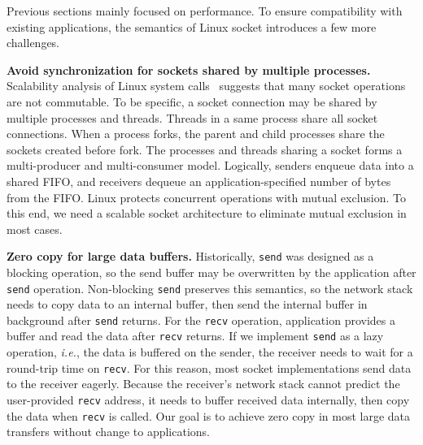 Previous sections mainly focused on performance. To ensure compatibility with existing applications, the semantics of Linux socket introduces a few more challenges.


\textbf{Avoid synchronization for sockets shared by multiple processes.}
Scalability analysis of Linux system calls~\cite{boyd2010analysis} suggests that many socket operations are not commutable. To be specific, a socket connection may be shared by multiple processes and threads. Threads in a same process share all socket connections. When a process forks, the parent and child processes share the sockets created before fork. The processes and threads sharing a socket forms a multi-producer and multi-consumer model. Logically, senders enqueue data into a shared FIFO, and receivers dequeue an application-specified number of bytes from the FIFO. Linux protects concurrent operations with mutual exclusion. To this end, we need a scalable socket architecture to eliminate mutual exclusion in most cases.


\textbf{Zero copy for large data buffers.}
Historically, \texttt{send} was designed as a blocking operation, so the send buffer may be overwritten by the application after \texttt{send} operation.
Non-blocking \texttt{send} preserves this semantics, so the network stack needs to copy data to an internal buffer, then send the internal buffer in background after \texttt{send} returns.
For the \texttt{recv} operation, application provides a buffer and read the data after \texttt{recv} returns.
If we implement \texttt{send} as a lazy operation, \textit{i.e.}, the data is buffered on the sender, the receiver needs to wait for a round-trip time on \texttt{recv}.
For this reason, most socket implementations send data to the receiver eagerly. Because the receiver's network stack cannot predict the user-provided \texttt{recv} address, it needs to buffer received data internally, then copy the data when \texttt{recv} is called.
Our goal is to achieve zero copy in most large data transfers without change to applications.

